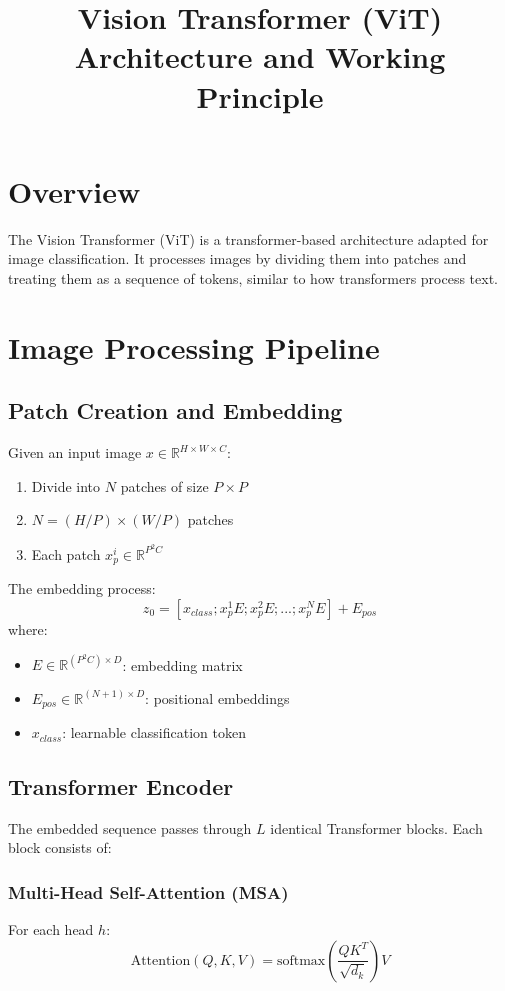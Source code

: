 \documentclass{article}
\title{Vision Transformer (ViT) Architecture and Working Principle}
\author{}
\date{}
\begin{document}
\maketitle

\section{Overview}
The Vision Transformer (ViT) is a transformer-based architecture adapted for image classification. It processes images by dividing them into patches and treating them as a sequence of tokens, similar to how transformers process text.

\section{Image Processing Pipeline}

\subsection{Patch Creation and Embedding}
Given an input image $x \in \mathbb{R}^{H \times W \times C}$:
\begin{enumerate}
    \item Divide into $N$ patches of size $P \times P$
    \item $N = (H/P) \times (W/P)$ patches
    \item Each patch $x_p^i \in \mathbb{R}^{P^2C}$
\end{enumerate}

The embedding process:
\begin{equation}
    z_0 = [x_{class}; x_p^1E; x_p^2E; ...; x_p^NE] + E_{pos}
\end{equation}
where:
\begin{itemize}
    \item $E \in \mathbb{R}^{(P^2C) \times D}$: embedding matrix
    \item $E_{pos} \in \mathbb{R}^{(N+1) \times D}$: positional embeddings
    \item $x_{class}$: learnable classification token
\end{itemize}

\subsection{Transformer Encoder}
The embedded sequence passes through $L$ identical Transformer blocks. Each block consists of:

\subsubsection{Multi-Head Self-Attention (MSA)}
For each head $h$:
\begin{equation}
    \text{Attention}(Q, K, V) = \text{softmax}\left(\frac{QK^T}{\sqrt{d_k}}\right)V
\end{equation}
\end{document}
